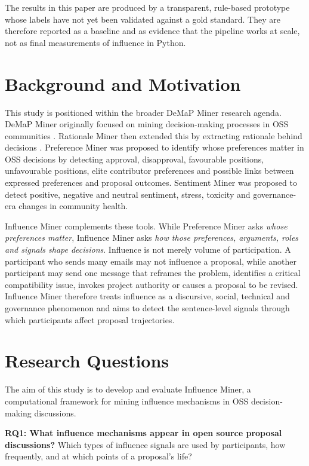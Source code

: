 \documentclass[sigconf,screen]{acmart}
\begin{document}
The results in this paper are produced by a transparent, rule-based prototype whose labels have not yet been validated against a gold standard. They are therefore reported as a baseline and as evidence that the pipeline works at scale, not as final measurements of influence in Python.

\section{Background and Motivation}

This study is positioned within the broader DeMaP Miner research agenda. DeMaP Miner originally focused on mining decision-making processes in OSS communities \cite{sharma2022demap}. Rationale Miner then extended this by extracting rationale behind decisions \cite{sharma2024rationale}. Preference Miner was proposed to identify whose preferences matter in OSS decisions by detecting approval, disapproval, favourable positions, unfavourable positions, elite contributor preferences and possible links between expressed preferences and proposal outcomes. Sentiment Miner was proposed to detect positive, negative and neutral sentiment, stress, toxicity and governance-era changes in community health.

Influence Miner complements these tools. While Preference Miner asks \emph{whose preferences matter}, Influence Miner asks \emph{how those preferences, arguments, roles and signals shape decisions}. Influence is not merely volume of participation. A participant who sends many emails may not influence a proposal, while another participant may send one message that reframes the problem, identifies a critical compatibility issue, invokes project authority or causes a proposal to be revised. Influence Miner therefore treats influence as a discursive, social, technical and governance phenomenon and aims to detect the sentence-level signals through which participants affect proposal trajectories.

\section{Research Questions}

The aim of this study is to develop and evaluate Influence Miner, a computational framework for mining influence mechanisms in OSS decision-making discussions.

\textbf{RQ1: What influence mechanisms appear in open source proposal discussions?} Which types of influence signals are used by participants, how frequently, and at which points of a proposal's life?
\end{document}
